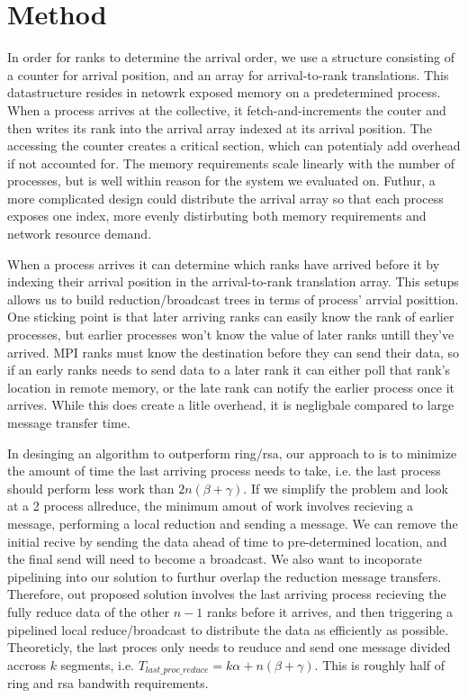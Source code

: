 \section{Method}
In order for ranks to determine the arrival order, we use a structure consisting of a counter for arrival position, and an array for arrival-to-rank translations.
This datastructure resides in netowrk exposed memory on a predetermined process.
When a process arrives at the collective, it fetch-and-increments the couter and then writes its rank into the arrival array indexed at its arrival position.
The accessing the counter creates a critical section, which can potentialy add overhead if not accounted for.
The memory requirements scale linearly with the number of processes, but is well within reason for the system we evaluated on.
Futhur, a more complicated design could distribute the arrival array so that each process exposes one index, more evenly distirbuting both memory requirements and network resource demand.

When a process arrives it can determine which ranks have arrived before it by indexing their arrival position in the arrival-to-rank translation array.
This setups allows us to build reduction/broadcast trees in terms of process' arrvial posittion.
One sticking point is that later arriving ranks can easily know the rank of earlier processes, but earlier processes won't know the value of later ranks untill they've arrived.
MPI ranks must know the destination before they can send their data, so if an early ranks needs to send data to a later rank it can either poll that rank's location in remote memory, or the late rank can notify the earlier process once it arrives.
While this does create a litle overhead, it is negligbale compared to large message transfer time.

In desinging an algorithm to outperform ring/rsa, our approach to is to minimize the amount of time the last arriving process needs to take, i.e. the last process should perform less work than $2n(\beta+\gamma)$. 
If we simplify the problem and look at a 2 process allreduce, the minimum amout of work involves recieving a message, performing a local reduction and sending a message.
We can remove the initial recive by sending the data ahead of time to pre-determined location, and the final send will need to become a broadcast. 
We also want to incoporate pipelining into our solution to furthur overlap the reduction message transfers.
Therefore, out proposed solution involves the last arriving process recieving the fully reduce data of the other $n-1$ ranks before it arrives, and then triggering a pipelined local reduce/broadcast to distribute the data as efficiently as possible. 
Theoreticly, the last proces only needs to reuduce and send one message divided accross $k$ segments, i.e. $T_{last\_proc\_reduce}=k\alpha+n(\beta+\gamma)$.
This is roughly half of ring and rsa bandwith requirements.

